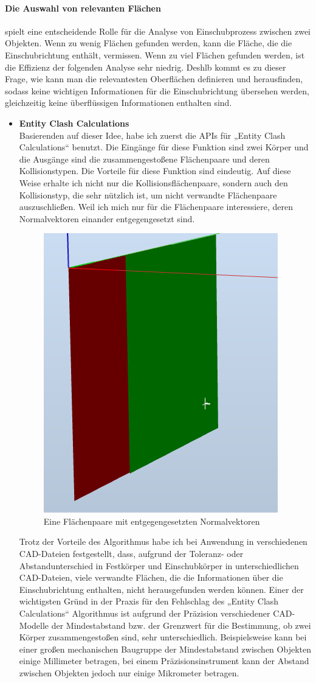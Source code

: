 \documentclass[14pt,a4paper,titlepage]{article}
\begin{document}
			\paragraph{Die Auswahl von relevanten Flächen}
			spielt eine entscheidende Rolle für die Analyse von Einschubprozess zwischen zwei Objekten. Wenn zu wenig Flächen gefunden werden, kann die Fläche, die die Einschubrichtung enthält, vermissen. Wenn zu viel Flächen gefunden werden, ist die Effizienz der folgenden Analyse sehr niedrig. Deshlb kommt es zu dieser Frage, wie kann man die relevantesten Oberflächen definieren und herausfinden, sodass keine wichtigen Informationen für die Einschubrichtung übersehen werden, gleichzeitig keine überflüssigen Informationen enthalten sind.
			\begin{itemize}
				\item 
				\textbf{Entity Clash Calculations}
				\\
				Basierenden auf dieser Idee, habe ich zuerst die APIs für „Entity Clash Calculations“ benutzt. Die Eingänge für diese Funktion sind zwei Körper und die Ausgänge sind die zusammengestoßene Flächenpaare und deren Kollisionstypen. Die Vorteile für diese Funktion sind eindeutig. Auf diese Weise erhalte ich nicht nur die Kollisionsflächenpaare, sondern auch den Kollisionstyp, die sehr nützlich ist, um nicht verwandte Flächenpaare auszuschließen. Weil ich mich nur für die Flächenpaare interessiere, deren Normalvektoren einander entgegengesetzt sind.
				\begin{figure}[h!]
					\centering
					\includegraphics[width=0.3\linewidth]{facepair.png}
					\caption{Eine Flächenpaare mit entgegengesetzten Normalvektoren}
				\end{figure}
			
			
				 Trotz der Vorteile des Algorithmus habe ich bei Anwendung in verschiedenen CAD-Dateien festgestellt, dass, aufgrund der Toleranz- oder Abstandunterschied in Festkörper und Einschubkörper in unterschiedlichen CAD-Dateien, viele verwandte Flächen, die die Informationen über die Einschubrichtung enthalten, nicht herausgefunden werden können. Einer der wichtigsten Gründ in der Praxis für den Fehlschlag des „Entity Clash Calculations“ Algorithmus ist aufgrund der Präzision verschiedener CAD-Modelle der Mindestabstand bzw. der Grenzwert für die Bestimmung, ob zwei Körper zusammengestoßen sind, sehr unterschiedlich. Beispielsweise kann bei einer großen mechanischen Baugruppe der Mindestabstand zwischen Objekten einige Millimeter betragen, bei einem Präzisionsinstrument kann der Abstand zwischen Objekten jedoch nur einige Mikrometer betragen.
				 \pagebreak
				 

\end{itemize}
\end{document}
